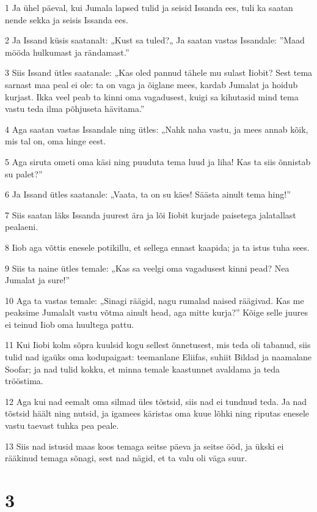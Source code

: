 \par 1 Ja ühel päeval, kui Jumala lapsed tulid ja seisid Issanda ees, tuli ka saatan nende sekka ja seisis Issanda ees.
\par 2 Ja Issand küsis saatanalt: „Kust sa tuled?„ Ja saatan vastas Issandale: ”Maad mööda hulkumast ja rändamast.”
\par 3 Siis Issand ütles saatanale: „Kas oled pannud tähele mu sulast Iiobit? Sest tema sarnast maa peal ei ole: ta on vaga ja õiglane mees, kardab Jumalat ja hoidub kurjast. Ikka veel peab ta kinni oma vagadusest, kuigi sa kihutasid mind tema vastu teda ilma põhjuseta hävitama.”
\par 4 Aga saatan vastas Issandale ning ütles: „Nahk naha vastu, ja mees annab kõik, mis tal on, oma hinge eest.
\par 5 Aga siruta ometi oma käsi ning puuduta tema luud ja liha! Kas ta siis õnnistab su palet?”
\par 6 Ja Issand ütles saatanale: „Vaata, ta on su käes! Säästa ainult tema hing!”
\par 7 Siis saatan läks Issanda juurest ära ja lõi Iiobit kurjade paisetega jalatallast pealaeni.
\par 8 Iiob aga võttis enesele potikillu, et sellega ennast kaapida; ja ta istus tuha sees.
\par 9 Siis ta naine ütles temale: „Kas sa veelgi oma vagadusest kinni pead? Nea Jumalat ja sure!”
\par 10 Aga ta vastas temale: „Sinagi räägid, nagu rumalad naised räägivad. Kas me peaksime Jumalalt vastu võtma ainult head, aga mitte kurja?” Kõige selle juures ei teinud Iiob oma huultega pattu.
\par 11 Kui Iiobi kolm sõpra kuulsid kogu sellest õnnetusest, mis teda oli tabanud, siis tulid nad igaüks oma kodupaigast: teemanlane Eliifas, suhiit Bildad ja naamalane Soofar; ja nad tulid kokku, et minna temale kaastunnet avaldama ja teda trööstima.
\par 12 Aga kui nad eemalt oma silmad üles tõstsid, siis nad ei tundnud teda. Ja nad tõstsid häält ning nutsid, ja igamees käristas oma kuue lõhki ning riputas enesele vastu taevast tuhka pea peale.
\par 13 Siis nad istusid maas koos temaga seitse päeva ja seitse ööd, ja ükski ei rääkinud temaga sõnagi, sest nad nägid, et ta valu oli väga suur.

\chapter{3}


